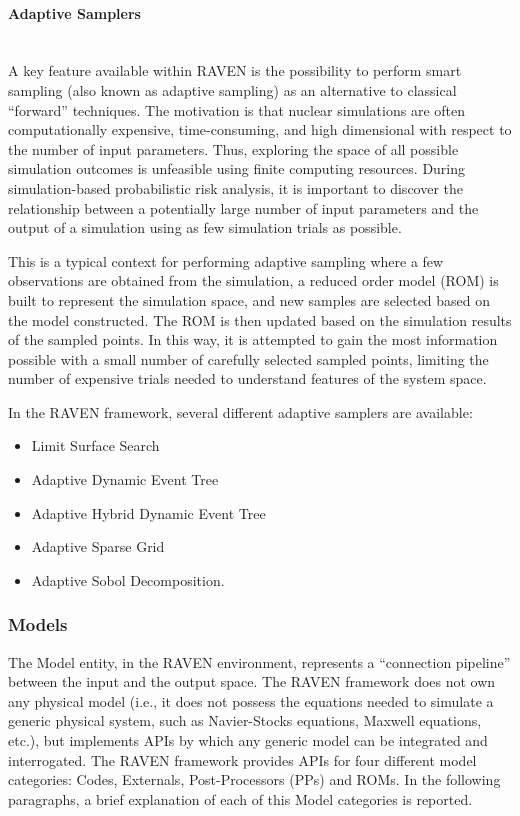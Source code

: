 \paragraph{Adaptive Samplers}~\\ 
A key feature available within RAVEN is the possibility to perform smart sampling (also known as adaptive sampling) as an alternative to classical ``forward'' techniques. The motivation is that nuclear simulations are often computationally expensive, time-consuming, and high dimensional with respect to the number of input parameters. Thus, exploring the space of all possible simulation outcomes is unfeasible using finite computing resources. During simulation-based probabilistic risk analysis, it is important to discover the relationship between a potentially large number of input parameters and the output of a simulation using as few simulation trials as possible. 

This is a typical context for performing adaptive sampling where a few observations are obtained from the simulation, a reduced order model (ROM) is built to represent the simulation space, and new samples are selected based on the model constructed. The ROM is then updated based on the simulation results of the sampled points. In this way, it is attempted to gain the most information possible with a small number of carefully selected sampled points, limiting the number of expensive trials needed to understand features of the system space.

In the RAVEN framework, several different adaptive samplers are available:
\begin{itemize}
\item Limit Surface Search
\item Adaptive Dynamic Event Tree
\item Adaptive Hybrid Dynamic Event Tree 
\item Adaptive Sparse Grid
\item Adaptive Sobol Decomposition.
\end{itemize}

\subsubsection{Models} 
The Model entity, in the RAVEN environment, represents a ``connection pipeline'' between the input and the output space. The RAVEN framework does not own any physical model (i.e., it does not possess the equations needed to simulate a generic physical system, such as Navier-Stocks equations, Maxwell equations, etc.), but implements APIs by which any generic model can be integrated and interrogated. The RAVEN framework provides APIs for four different model categories: Codes, Externals, Post-Processors (PPs) and ROMs. In the following paragraphs, a brief explanation of each of this Model categories is reported. 

